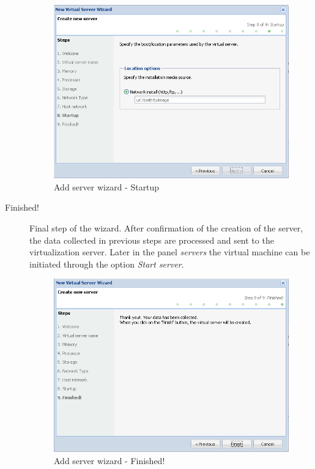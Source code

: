 \begin{description}
		\begin{figure}[H]
			\begin{center}
			\includegraphics[scale=0.5]{screenshots/server_createwiz_startup.png}
			\caption{Add server wizard - Startup}
			\label{fig:server_createwiz_startup}
			\end{center}
		\end{figure}

	\item[Finished!] Final step of the wizard. After confirmation of the creation of the server, the data collected in previous steps are processed and sent to the virtualization server. Later in the panel \emph{servers} the virtual machine can be initiated through the option \emph{Start server}.

		\begin{figure}[H]
			\begin{center}
			\includegraphics[scale=0.5]{screenshots/server_createwiz_finish.png}
			\caption{Add server wizard - Finished!}
			\label{fig:server_createwiz_finish}
			\end{center}
		\end{figure}

\end{description}

